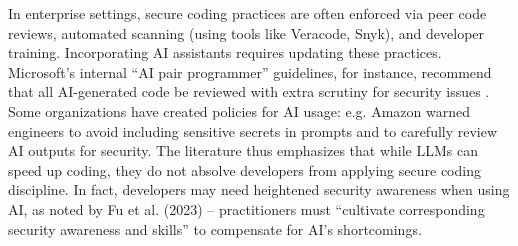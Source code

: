 In enterprise settings, secure coding practices are often enforced via peer code reviews, automated scanning (using tools like Veracode, Snyk), and developer training. Incorporating AI assistants requires updating these practices. Microsoft’s internal “AI pair programmer” guidelines, for instance, recommend that all AI-generated code be reviewed with extra scrutiny for security issues \autocite{Microsoft2023guidelines}. Some organizations have created policies for AI usage: e.g. Amazon warned engineers to avoid including sensitive secrets in prompts and to carefully review AI outputs for security​. The literature thus emphasizes that while LLMs can speed up coding, they do not absolve developers from applying secure coding discipline. In fact, developers may need heightened security awareness when using AI, as noted by Fu et al. (2023) – practitioners must “cultivate corresponding security awareness and skills” to compensate for AI’s shortcomings​.

